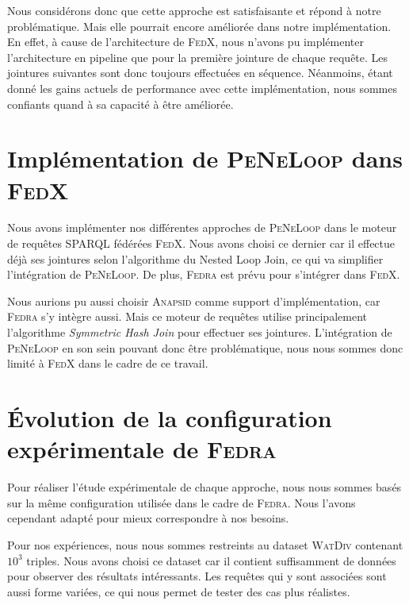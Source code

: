 \documentclass[a4paper]{article}
\def\sparql{\textsc{SPARQL}\xspace}
\def\fedra{\textsc{Fedra}\xspace}
\def\fedx{\textsc{FedX}\xspace}
\def\peneloop{\textsc{PeNeLoop}\xspace}
\begin{document}
Nous considérons donc que cette approche est satisfaisante et répond à notre problématique. Mais elle pourrait encore améliorée dans notre implémentation. En effet, à cause de l'architecture de \fedx, nous n'avons pu implémenter l'architecture en pipeline que pour la première jointure de chaque requête. Les jointures suivantes sont donc toujours effectuées en séquence. Néanmoins, étant donné les gains actuels de performance avec cette implémentation, nous sommes confiants quand à sa capacité à être améliorée.

\section{Implémentation de \peneloop dans \fedx}

Nous avons implémenter nos différentes approches de \peneloop dans le moteur de requêtes \sparql fédérées \fedx. Nous avons choisi ce dernier car il effectue déjà ses jointures selon l'algorithme du Nested Loop Join, ce qui va simplifier l'intégration de \peneloop. De plus, \fedra est prévu pour s'intégrer dans \fedx.

Nous aurions pu aussi choisir \textsc{Anapsid} \cite{acosta2011anapsid} comme support d'implémentation, car \fedra s'y intègre aussi. Mais ce moteur de requêtes utilise principalement l'algorithme \textit{Symmetric Hash Join} pour effectuer ses jointures. L'intégration de \peneloop en son sein pouvant donc être problématique, nous nous sommes donc limité à \fedx dans le cadre de ce travail.

\section{Évolution de la configuration expérimentale de \fedra}\label{sec:setup}

Pour réaliser l'étude expérimentale de chaque approche, nous nous sommes basés sur la même configuration utilisée dans le cadre de \fedra \cite{montoya2014fedra}. Nous l'avons cependant adapté pour mieux correspondre à nos besoins.

Pour nos expériences, nous nous sommes restreints au dataset \textsc{WatDiv} contenant $10^3$ triples. Nous avons choisi ce dataset car il contient suffisamment de données pour observer des résultats intéressants. Les requêtes qui y sont associées sont aussi forme variées, ce qui nous permet de tester des cas plus réalistes.
\end{document}
